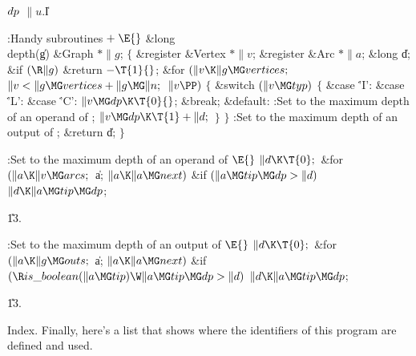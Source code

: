 \Y\B\4\D$\\{dp}$ \5
$\|u.{}$\|I\par
\Y\B\4:Handy subroutines\X${}\mathrel+\E{}$\6
\1\1\&{long} \\{depth}(\|g)\6
\&{Graph} ${}{*}\|g{}$;\2\2\6
${}\{{}$\5
\1\&{register} \&{Vertex} ${}{*}\|v{}$;\6
\&{register} \&{Arc} ${}{*}\|a{}$;\6
\&{long} \|d;\7
\&{if} ${}(\R\|g){}$\1\5
\&{return} ${}{-}\T{1}{}$;\2\6
\&{for} ${}(\|v\K\|g\MG\\{vertices};{}$ ${}\|v<\|g\MG\\{vertices}+\|g\MG\|n;{}$
${}\|v\PP){}$\5
${}\{{}$\1\6
\&{switch} ${}(\|v\MG\\{typ}){}$\5
${}\{{}$\1\6
\4\&{case} \.{'I'}:\5
\&{case} \.{'L'}:\5
\&{case} \.{'C'}:\5
${}\|v\MG\\{dp}\K\T{0}{}$;\5
\&{break};\6
\4\&{default}:\5
:Set  to the maximum depth of an operand of \X;\6
${}\|v\MG\\{dp}\K\T{1}+\|d;{}$\6
\4${}\}{}$\2\6
\4${}\}{}$\2\6
:Set  to the maximum depth of an output of \X;\6
\&{return} \|d;\6
\4${}\}{}$\2\par
\fi

\B{}:Set  to the maximum depth of an operand of \X${}%
\E{}$\6
$\|d\K\T{0};{}$\6
\&{for} ${}(\|a\K\|v\MG\\{arcs};{}$ \|a; ${}\|a\K\|a\MG\\{next}){}$\1\6
\&{if} ${}(\|a\MG\\{tip}\MG\\{dp}>\|d){}$\1\5
${}\|d\K\|a\MG\\{tip}\MG\\{dp}{}$;\2\2\par
\U13.\fi

\B{}:Set  to the maximum depth of an output of \X${}%
\E{}$\6
$\|d\K\T{0};{}$\6
\&{for} ${}(\|a\K\|g\MG\\{outs};{}$ \|a; ${}\|a\K\|a\MG\\{next}){}$\1\6
\&{if} ${}(\R\\{is\_boolean}(\|a\MG\\{tip})\W\|a\MG\\{tip}\MG\\{dp}>\|d){}$\1\5
${}\|d\K\|a\MG\\{tip}\MG\\{dp}{}$;\2\2\par
\U13.\fi

Index. Finally, here's a list that shows where the identifiers of this
program are defined and used.
\fi

\inx
\fin
\con
